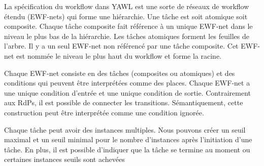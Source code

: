 La spécification du workflow dans YAWL est une sorte de réseaux de workflow étendu (EWF-nets) qui forme une hiérarchie. Une tâche est soit atomique soit composite. Chaque tâche composite fait référence à un unique EWF-net dans le niveau le plus bas de la hiérarchie. Les tâches atomiques forment les feuilles de l'arbre. Il y a un seul EWF-net non référencé par une tâche composite. Cet EWF-net est nommée le niveau le plus haut du workflow et forme la racine. 

Chaque EWF-net consiste en des tâches (composites ou atomiques) et des conditions qui peuvent être interprétées comme des places. 
Chaque EWF-net a une unique condition d'entrée et une unique condition de sortie. Contrairement aux RdPs, il est possible de connecter les transitions. Sémantiquement, cette construction peut être interprétée comme une condition ignorée.

Chaque tâche peut avoir des instances multiples. Nous pouvons créer un seuil maximal et un seuil minimal pour le nombre d'instances après l'initiation d'une tâche. En plus, il est possible d'indiquer que la tâche se termine au moment ou certaines instances seuils sont achevées

    